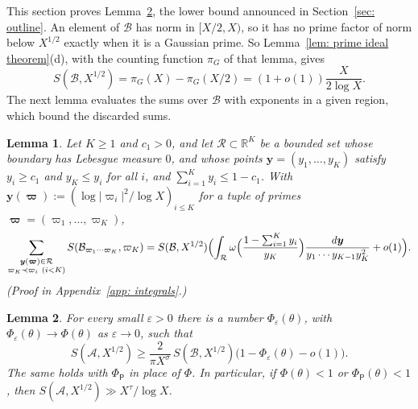 \documentclass{article}
\numberwithin{equation}{section}
\newtheorem{lemma}{Lemma}
\newcommand{\Le}{\leqslant}
\newcommand{\Ge}{\geqslant}
\begin{document}
This section proves Lemma~\ref{lem: lower bound}, the lower bound announced in Section~\ref{sec: outline}. An element of $\mathcal{B}$ has norm in $[X/2, X)$, so it has no prime factor of norm below $X^{1/2}$ exactly when it is a Gaussian prime. So Lemma~\ref{lem: prime ideal theorem}(d), with the counting function $\pi_G$ of that lemma, gives
\begin{equation}
\label{eq: primes in B}
S(\mathcal{B}, X^{1/2}) = \pi_G(X) - \pi_G(X/2) = (1 + o(1)) \frac{X}{2\log X}.
\end{equation}
The next lemma evaluates the sums over $\mathcal{B}$ with exponents in a given region, which bound the discarded sums.

\begin{lemma}
\label{lem: boxes to integrals}
Let $K \Ge 1$ and $c_1 > 0$, and let $\mathcal{R} \subset \mathbb{R}^K$ be a bounded set whose boundary has Lebesgue measure $0$, and whose points $\boldsymbol{y} = (y_1, \dots, y_K)$ satisfy $y_i \Ge c_1$ and $y_K \Le y_i$ for all $i$, and $\sum_{i=1}^{K} y_i \Le 1 - c_1$.
With $\boldsymbol{y}(\boldsymbol{\varpi}) := (\log|\varpi_i|^2/\log X)_{i \Le K}$ for a tuple of primes $\boldsymbol{\varpi} = (\varpi_1, \dots, \varpi_K)$,
\begin{equation}
\label{eq: boxes to integrals}
\sum_{\substack{\boldsymbol{y}(\boldsymbol{\varpi}) \in \mathcal{R} \\ \varpi_K \prec \varpi_i\ (i < K)}} S(\mathcal{B}_{\varpi_1 \cdots \varpi_K}, \varpi_K) = S(\mathcal{B}, X^{1/2}) \Bigl( \int_{\mathcal{R}} \omega\Bigl( \frac{1 - \sum_{i=1}^{K} y_i}{y_K} \Bigr) \frac{d\boldsymbol{y}}{y_1 \cdots y_{K-1} y_K^2} + o(1) \Bigr).
\end{equation}
\emph{(Proof in Appendix~\ref{app: integrals}.)}
\end{lemma}

\begin{lemma}
\label{lem: lower bound}
For every small $\varepsilon > 0$ there is a number $\Phi_\varepsilon(\theta)$, with $\Phi_\varepsilon(\theta) \to \Phi(\theta)$ as $\varepsilon \to 0$, such that
\begin{equation}
\label{eq: lower bound}
S(\mathcal{A}, X^{1/2}) \Ge \frac{2}{\pi X^{\sigma}}\, S(\mathcal{B}, X^{1/2}) \bigl( 1 - \Phi_\varepsilon(\theta) - o(1) \bigr).
\end{equation}
The same holds with $\Phi_{\mathsf{P}}$ in place of $\Phi$. In particular, if $\Phi(\theta) < 1$ or $\Phi_{\mathsf{P}}(\theta) < 1$, then $S(\mathcal{A}, X^{1/2}) \gg X^{\tau}/\log X$.
\end{lemma}
\end{document}
